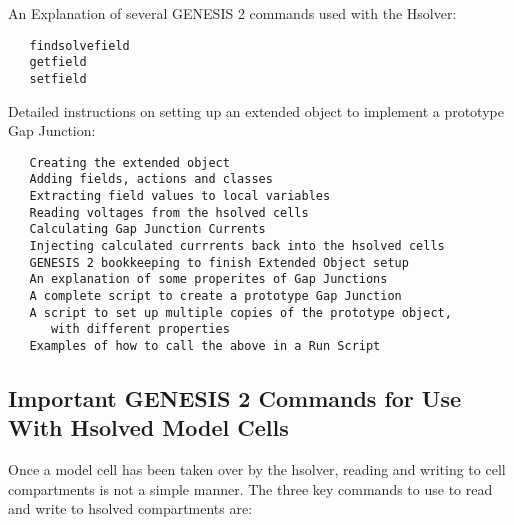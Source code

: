 \documentclass[12pt]{article}
\begin{document}
An Explanation of several GENESIS 2 commands used with the Hsolver:
\begin{verbatim}
   findsolvefield
   getfield
   setfield
\end{verbatim}
Detailed instructions on setting up an extended object to implement a prototype Gap Junction:
\begin{verbatim}
   Creating the extended object
   Adding fields, actions and classes
   Extracting field values to local variables
   Reading voltages from the hsolved cells
   Calculating Gap Junction Currents
   Injecting calculated currrents back into the hsolved cells
   GENESIS 2 bookkeeping to finish Extended Object setup
   An explanation of some properites of Gap Junctions
   A complete script to create a prototype Gap Junction
   A script to set up multiple copies of the prototype object,
      with different properties
   Examples of how to call the above in a Run Script
\end{verbatim}

\subsection*{Important GENESIS 2 Commands for Use With Hsolved Model Cells}

Once a model cell has been taken over by the hsolver, reading and writing to cell compartments is not a simple manner. The three key commands to use to read and write to hsolved compartments are:
\end{document}
